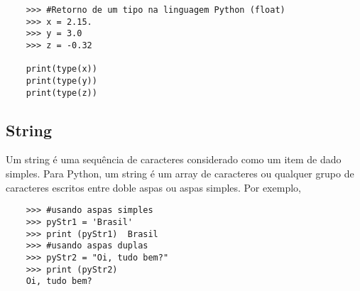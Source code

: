\begin{lstlisting}
	>>> #Retorno de um tipo na linguagem Python (float)
	>>> x = 2.15.
	>>> y = 3.0
	>>> z = -0.32
	
	print(type(x))
	print(type(y))
	print(type(z))
\end{lstlisting} 
   
            \subsection{String}
            Um string \'{e} uma sequ\^{e}ncia de caracteres considerado como um item de dado simples. Para Python, um string \'{e} um array de caracteres ou qualquer grupo de caracteres escritos entre doble aspas ou aspas simples. Por exemplo,
    \begin{lstlisting}
    >>> #usando aspas simples
    >>> pyStr1 = 'Brasil'
    >>> print (pyStr1)  Brasil
    >>> #usando aspas duplas
    >>> pyStr2 = "Oi, tudo bem?"
    >>> print (pyStr2)
    Oi, tudo bem?
    \end{lstlisting}

